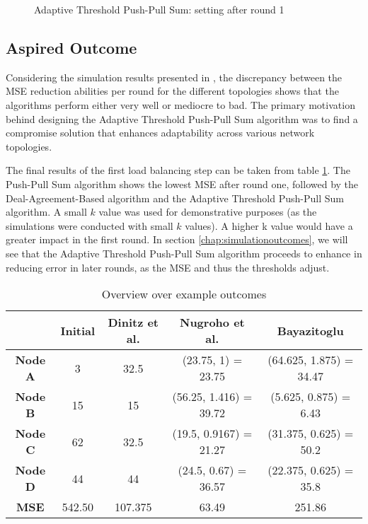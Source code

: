 \begin{figure}
    \centering
    \scalebox{0.75}{}
    \caption{Adaptive Threshold Push-Pull Sum: setting after round 1}
    \label{fig:ATPPSExampleResult}
\end{figure}
\subsection{Aspired Outcome}\label{subsec:aspiredOutcomeAdaptiveThresholdPPS}

Considering the simulation results presented in \cite{Bayazitoglu}, the discrepancy between the MSE reduction abilities per round for the different topologies shows that the algorithms perform either very well or mediocre to bad. The primary motivation behind designing the Adaptive Threshold Push-Pull Sum algorithm was to find a compromise solution that enhances adaptability across various network topologies.

The final results of the first load balancing step can be taken from table \ref{tab:overviewExamples}. The Push-Pull Sum algorithm shows the lowest MSE after round one, followed by the Deal-Agreement-Based algorithm and the Adaptive Threshold Push-Pull Sum algorithm. A small $k$ value was used for demonstrative purposes (as the simulations were conducted with small $k$ values). A higher k value would have a greater impact in the first round. In section \ref{chap:simulationoutcomes}, we will see that the Adaptive Threshold Push-Pull Sum algorithm proceeds to enhance in reducing error in later rounds, as the MSE and thus the thresholds adjust.

\begin{table}
\centering
\begin{tabular}{|c|c|c|c|c|}
\hline
 & \textbf{Initial} & \textbf{Dinitz et al.} & \textbf{Nugroho et al.} & \textbf{Bayazitoglu} \\ \hline
\textbf{Node A}  & 3      & 32.5    & (23.75, 1) = 23.75     & (64.625, 1.875) = 34.47 \\ \hline
\textbf{Node B}  & 15     & 15      & (56.25, 1.416) = 39.72 & (5.625, 0.875) = 6.43   \\ \hline
\textbf{Node C}  & 62     & 32.5    & (19.5, 0.9167) = 21.27 & (31.375, 0.625) = 50.2  \\ \hline
\textbf{Node D}  & 44     & 44      & (24.5, 0.67) = 36.57   & (22.375, 0.625) = 35.8  \\ \hline
\textbf{MSE} & 542.50 & 107.375 & 63.49                  & 251.86                  \\ \hline
\end{tabular}
\caption{Overview over example outcomes}
\label{tab:overviewExamples}
\end{table}
